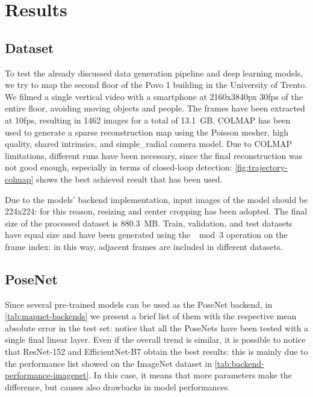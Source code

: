 \section{Results}

\subsection{Dataset}
To test the already discussed data generation pipeline and deep learning models, we try to map the second floor of the Povo 1 building in the University of Trento.
We filmed a single vertical video with a smartphone at 2160x3840px 30fps of the entire floor, avoiding moving objects and people. The frames have been extracted at 10fps, resulting in 1462 images for a total of 13.1 GB. COLMAP has been used to generate a sparse reconstruction map using the Poisson mesher, high quality, shared intrinsics, and simple\_radial camera model.
Due to COLMAP limitations, different runs have been necessary, since the final reconstruction was not good enough, especially in terms of closed-loop detection: \cref{fig:trajectory-colmap} shows the best achieved result that has been used.

Due to the models' backend implementation, input images of the model should be 224x224: for this reason, resizing and center cropping has been adopted. The final size of the processed dataset is 880.3 MB. Train, validation, and test datasets have equal size and have been generated using the $\mod{3}$ operation on the frame index: in this way, adjacent frames are included in different datasets.

\subsection{PoseNet}
Since several pre-trained models can be used as the PoseNet backend, in \cref{tab:mapnet-backends} we present a brief list of them with the respective mean absolute error in the test set: notice that all the PoseNets have been tested with a single final linear layer. Even if the overall trend is similar, it is possible to notice that ResNet-152 and EfficientNet-B7 obtain the best results: this is mainly due to the performance list showed on the ImageNet dataset in \cref{tab:backend-performance-imagenet}. In this case, it means that more parameters make the difference, but causes also drawbacks in model performances.


